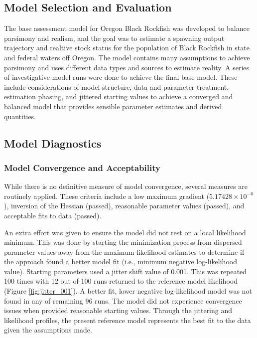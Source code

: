 \documentclass[11pt,
  english,
  letterpaper,
]{article}
\begin{document}
\hypertarget{model-selection-and-evaluation}{%
\subsection{Model Selection and Evaluation}\label{model-selection-and-evaluation}}

The base assessment model for Oregon Black Rockfish was developed to balance parsimony and realism, and the goal was to estimate a spawning output trajectory and realtive stock status for the population of Black Rockfish in state and federal waters off Oregon. The model contains many assumptions to achieve parsimony and uses different data types and sources to estimate reality. A series of investigative model runs were done to achieve the final base model. These include considerations of model structure, data and parameter treatment, estimation phasing, and jittered starting values to achieve a converged and balanced model that provides sensible parameter estimates and derived quantities.

\hypertarget{model-diagnostics}{%
\subsection{Model Diagnostics}\label{model-diagnostics}}

\hypertarget{model-convergence-and-acceptability}{%
\subsubsection{Model Convergence and Acceptability}\label{model-convergence-and-acceptability}}

While there is no definitive measure of model convergence, several measures are routinely applied. These criteria include a low maximum gradient (\ensuremath{5.17428\times 10^{-6}}), inversion of the Hessian (passed), reasonable parameter values (passed), and acceptable fits to data (passed).

An extra effort was given to ensure the model did not rest on a local likelihood minimum. This was done by starting the minimization process from dispersed parameter values away from the maximum likelihood estimates to determine if the approach found a better model fit (i.e., minimum negative log-likelihood value). Starting parameters used a jitter shift value of 0.001. This was repeated 100 times with 12 out of 100 runs returned to the reference model likelihood (Figure \ref{fig:jitter_001}). A better fit, lower negative log-likelihood model was not found in any of remaining 96 runs. The model did not experience convergence issues when provided reasonable starting values. Through the jittering and likelihood profiles, the present reference model represents the best fit to the data given the assumptions made.
\end{document}

